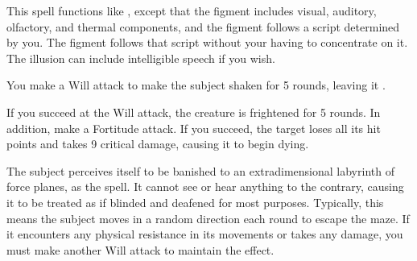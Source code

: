 \begin{spelleffect}
  This spell functions like , except that the figment includes visual, auditory, olfactory, and thermal components, and the figment follows a script determined by you. The figment follows that script without your having to concentrate on it. The illusion can include intelligible speech if you wish.
\end{spelleffect}

\spellrng{\rngmed}
\begin{spelleffect}
    You make a Will attack to make the subject shaken for 5 rounds, leaving it \vulnerable.
\end{spelleffect}
\begin{spellblood}
    If you succeed at the Will attack, the creature is frightened for 5 rounds. In addition, make a Fortitude attack. If you succeed, the target loses all its hit points and takes 9 critical damage, causing it to begin dying.
\end{spellblood}

\spellrng{\rngclose}
\spelldur{\durmed}
\begin{spelleffect}
  The subject perceives itself to be banished to an extradimensional labyrinth of force planes, as the  spell. It cannot see or hear anything to the contrary, causing it to be treated as if blinded and deafened for most purposes. Typically, this means the subject moves in a random direction each round to escape the maze. If it encounters any physical resistance in its movements or takes any damage, you must make another Will attack to maintain the effect.
\end{spelleffect}

